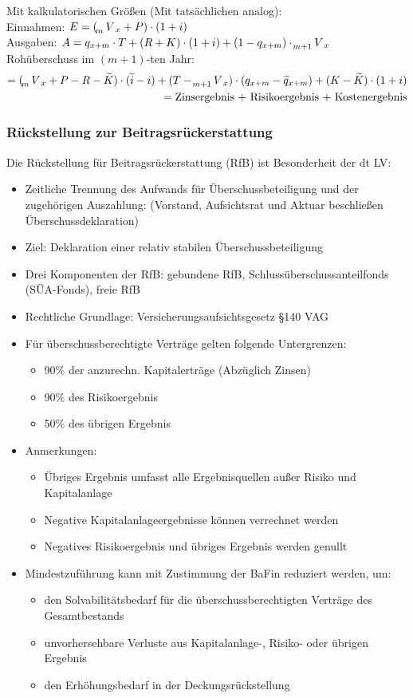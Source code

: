 \documentclass[12pt]{report}
\theoremstyle{dotless}
\theoremstyle{definition}
\begin{document}
Mit kalkulatorischen Größen (Mit tatsächlichen analog): \\
Einnahmen: $E=(\tensor[_m]{V}{}_x + P) \cdot (1+i)$\\
Ausgaben: $A=q_{x+m} \cdot T + (R+K) \cdot (1+i) + (1-q_{x+m})\cdot \tensor[_{m+1}]{V}{}_x$\\
Rohüberschuss im $(m+1)$-ten Jahr:
\begin{align}
=(\tensor[_m]{V}{}_x + P - R - \widetilde{K}) \cdot (\widetilde{i}-i) + (T -\tensor[_{m+1}]{V}{}_x) \cdot (q_{x+m} - \widetilde{q}_{x+m})+(K - \widetilde{K} ) \cdot (1+i) \\ = \text{Zinsergebnis + Risikoergebnis + Kostenergebnis}
\end{align}


\subsubsection{Rückstellung zur Beitragsrückerstattung}
Die Rückstellung für Beitragsrückerstattung (RfB) ist Besonderheit der dt LV:
\begin{itemize}
\item Zeitliche Trennung des Aufwands für Überschussbeteiligung und der zugehörigen Auszahlung: (Vorstand, Aufsichtsrat und Aktuar beschließen Überschussdeklaration)
\item Ziel: Deklaration einer relativ stabilen Überschussbeteiligung
\item Drei Komponenten der RfB: gebundene RfB, Schlussüberschussanteilfonds (SÜA-Fonds), freie RfB
\item Rechtliche Grundlage: Versicherungsaufsichtsgesetz §140 VAG
\item Für überschussberechtigte Verträge gelten folgende Untergrenzen:
\begin{itemize}
\item 90\% der anzurechn. Kapitalerträge (Abzüglich Zinsen)
\item 90\% des Risikoergebnis
\item 50\% des übrigen Ergebnis
\end{itemize}
\item Anmerkungen:
\begin{itemize}
\item Übriges Ergebnis umfasst alle Ergebnisquellen außer Risiko und Kapitalanlage
\item Negative Kapitalanlageergebnisse können verrechnet werden
\item Negatives Risikoergebnis und übriges Ergebnis werden genullt
\end{itemize}
\item Mindestzuführung kann mit Zustimmung der BaFin reduziert werden, um:
\begin{itemize}
\item den Solvabilitätsbedarf für die überschussberechtigten Verträge des Gesamtbestands
\item unvorhersehbare Verluste aus Kapitalanlage-, Risiko- oder übrigen Ergebnis
\item den Erhöhungsbedarf in der Deckungsrückstellung
\end{itemize}
\end{itemize}
\end{document}

